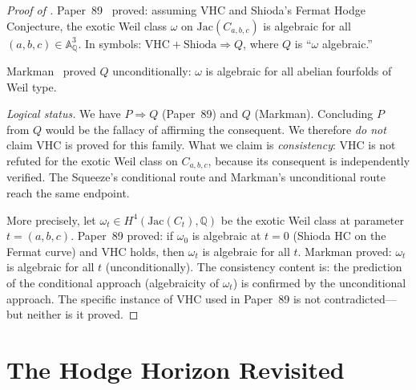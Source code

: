 \documentclass[11pt]{article}
\theoremstyle{plain}
\theoremstyle{definition}
\theoremstyle{remark}
\newcommand{\QQ}{\mathbb{Q}}
\newcommand{\Aff}{\mathbb{A}}
\newcommand{\Jac}{\mathrm{Jac}}
\begin{document}
\begin{proof}[Proof of ]
Paper~89~\cite{p89} proved: assuming VHC and Shioda's Fermat Hodge
Conjecture, the exotic Weil class $\omega$ on $\Jac(C_{a,b,c})$ is
algebraic for all $(a,b,c) \in \Aff^3_\QQ$.  In symbols:
$\text{VHC} + \text{Shioda} \Rightarrow Q$, where $Q$ is
``$\omega$ algebraic.''

Markman~\cite{markman2025} proved $Q$ unconditionally: $\omega$ is
algebraic for all abelian fourfolds of Weil type.

\emph{Logical status.}  We have $P \Rightarrow Q$ (Paper~89) and $Q$
(Markman).  Concluding $P$ from $Q$ would be the fallacy of affirming
the consequent.  We therefore \emph{do not} claim VHC is proved for
this family.  What we claim is \emph{consistency}: VHC is not refuted
for the exotic Weil class on $C_{a,b,c}$, because its consequent is
independently verified.  The Squeeze's conditional route and
Markman's unconditional route reach the same endpoint.

More precisely, let $\omega_t \in H^4(\Jac(C_t), \QQ)$ be the
exotic Weil class at parameter $t = (a,b,c)$.  Paper~89 proved:
if $\omega_0$ is algebraic at $t = 0$ (Shioda HC on the Fermat
curve) and VHC holds, then $\omega_t$ is algebraic for all $t$.
Markman proved: $\omega_t$ is algebraic for all $t$ (unconditionally).
The consistency content is: the prediction of the conditional
approach (algebraicity of $\omega_t$) is confirmed by the
unconditional approach.  The specific instance of VHC used in
Paper~89 is not contradicted---but neither is it proved.
\end{proof}

\section{The Hodge Horizon Revisited}\label{sec:horizon}
\end{document}
